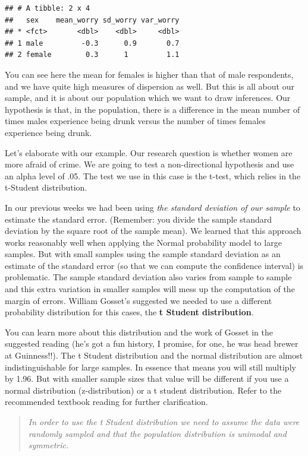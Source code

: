 \documentclass[
]{book}
\begin{document}
\begin{verbatim}
## # A tibble: 2 x 4
##   sex    mean_worry sd_worry var_worry
## * <fct>       <dbl>    <dbl>     <dbl>
## 1 male         -0.3      0.9       0.7
## 2 female        0.3      1         1.1
\end{verbatim}

You can see here the mean for females is higher than that of male respondents, and we have quite high measures of dispersion as well. But this is all about our sample, and it is about our population which we want to draw inferences. Our hypothesis is that, in the population, there is a difference in the mean number of times males experience being drunk versus the number of times females experience being drunk.

Let's elaborate with our example. Our research question is whether women are more afraid of crime. We are going to test a non-directional hypothesis and use an alpha level of .05. The test we use in this case is the t-test, which relies in the t-Student distribution.

In our previous weeks we had been using \emph{the standard deviation of our sample} to estimate the standard error. (Remember: you divide the sample standard deviation by the square root of the sample mean). We learned that this approach works reasonably well when applying the Normal probability model to large samples. But with small samples using the sample standard deviation as an estimate of the standard error (so that we can compute the confidence interval) is problematic. The sample standard deviation also varies from sample to sample and this extra variation in smaller samples will mess up the computation of the margin of errors. William Gosset's suggested we needed to use a different probability distribution for this cases, the \textbf{t Student distribution}.

You can learn more about this distribution and the work of Gosset in the suggested reading (he's got a fun history, I promise, for one, he was head brewer at Guinness!!). The t Student distribution and the normal distribution are almost indistinguishable for large samples. In essence that means you will still multiply by 1.96. But with smaller sample sizes that value will be different if you use a normal distribution (z-distribution) or a t student distribution. Refer to the recommended textbook reading for further clarification.

\begin{quote}
\emph{In order to use the t Student distribution we need to assume the data were randomly sampled and that the population distribution is unimodal and symmetric.}
\end{quote}
\end{document}
